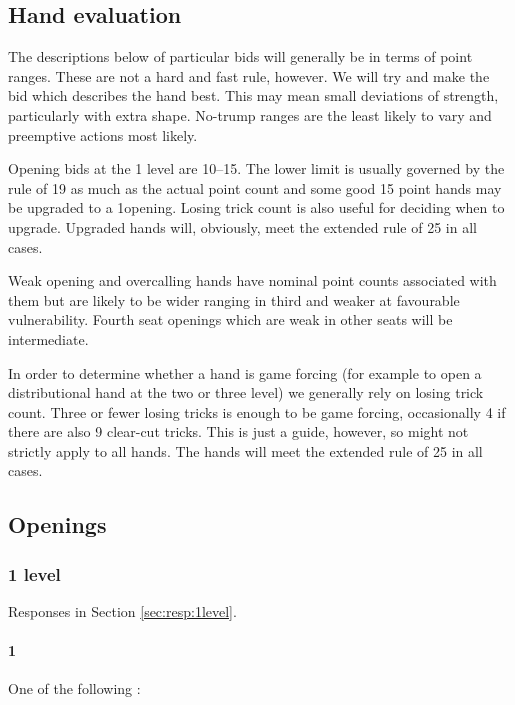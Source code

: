 \documentclass[a4paper,14pt]{extarticle}
\begin{document}
\subsection{Hand evaluation}

The descriptions below of particular bids will generally be in terms of point
ranges. These are not a hard and fast rule, however. We will try and make the
bid which describes the hand best. This may mean small deviations of strength, 
particularly with extra shape. No-trump ranges are the least likely to vary and
preemptive actions most likely.

Opening bids at the 1 level are 10--15. The lower limit is usually governed by
the rule of 19 as much as the actual point count and some good 15 point hands
may be upgraded to a 1\diamonds opening. Losing trick count is also 
useful for deciding when to upgrade. Upgraded hands will, obviously, meet the
extended rule of 25 in all cases. 

Weak opening and overcalling hands have nominal point counts associated with
them but are likely to be wider ranging in third and weaker at favourable
vulnerability. Fourth seat openings which are weak in other seats will be 
intermediate.

In order to determine whether a hand is game forcing (for example to open a
distributional hand at the two or three level) we generally
rely on losing trick count. Three or fewer losing tricks is enough to be game
forcing, occasionally 4 if there are also 9 clear-cut tricks. This is just a
guide, however, so might not strictly apply to all hands. The hands will meet
the extended rule of 25 in all cases.

\newpage

\subsection{Openings}
\label{sec:openings}

\subsubsection{1 level}
\label{sec:open:1level}

Responses in Section \ref{sec:resp:1level}.

\paragraph{1\clubs}

One of the following :
\end{document}
